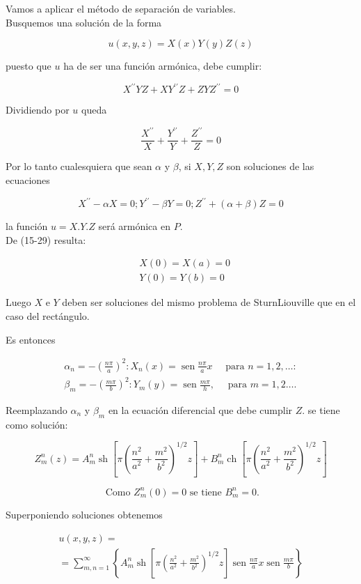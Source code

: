 \documentclass[10pt]{article}
\theoremstyle{plain}
\theoremstyle{definition}
\theoremstyle{remark}
\begin{document}
Vamos a aplicar el método de separación de variables.\\
Busquemos una solución de la forma

$$
u(x, y, z)=X(x) Y(y) Z(z)
$$

puesto que $u$ ha de ser una función armónica, debe cumplir:

$$
X^{\prime \prime} Y Z+X Y^{\prime \prime} Z+Z Y Z^{\prime \prime}=0
$$

Dividiendo por $u$ queda

$$
\frac{X^{\prime \prime}}{X}+\frac{Y^{\prime \prime}}{Y}+\frac{Z^{\prime \prime}}{Z}=0
$$

Por lo tanto cualesquiera que sean $\alpha$ y $\beta$, si $X, Y, Z$ son soluciones de las ecuaciones

$$
X^{\prime \prime}-\alpha X=0 ; Y^{\prime \prime}-\beta Y=0 ; Z^{\prime \prime}+(\alpha+\beta) Z=0
$$

la función $u=X . Y . Z$ será armónica en $P$.\\
De (15-29) resulta:

$$
\begin{aligned}
& X(0)=X(a)=0 \\
& Y(0)=Y(b)=0
\end{aligned}
$$

Luego $X$ e $Y$ deben ser soluciones del mismo problema de SturnLiouville que en el caso del rectángulo.

Es entonces

$$
\begin{array}{ll}
\alpha_{n}=-\left(\frac{n \pi}{a}\right)^{2}: X_{n}(x)=\operatorname{sen} \frac{n \pi}{a} x \quad \text { para } n=1,2, \ldots: \\
\beta_{m}=-\left(\frac{m \pi}{b}\right)^{2}: Y_{m}(y)=\operatorname{sen} \frac{m \pi}{h}, \quad \text { para } m=1,2 \ldots .
\end{array}
$$

Reemplazando $\alpha_{n}$ y $\beta_{m}$ en la ecuación diferencial que debe cumplir $Z$. se tiene como solución:


$$
Z_{m}^{n}(z)=A_{m}^{n} \operatorname{sh}\left[\pi\left(\frac{n^{2}}{a^{2}}+\frac{m^{2}}{b^{2}}\right)^{1 / 2} z\right]+B_{m}^{n} \operatorname{ch}\left[\pi\left(\frac{n^{2}}{a^{2}}+\frac{m^{2}}{b^{2}}\right)^{1 / 2} z\right]
$$

$$
\text { Como } Z_{m}^{n}(0)=0 \text { se tiene } B_{m}^{n}=0 .
$$

Superponiendo soluciones obtenemos


\begin{gather*}
u(x, y, z)= \\
=\sum_{m, n=1}^{\infty}\left\{A_{m}^{n} \operatorname{sh}\left[\pi\left(\frac{n^{2}}{a^{2}}+\frac{m^{2}}{b^{2}}\right)^{1 / 2} z\right] \operatorname{sen} \frac{n \pi}{a} x \operatorname{sen} \frac{m \pi}{b}\right\} \tag{15-30}
\end{gather*}
\end{document}
